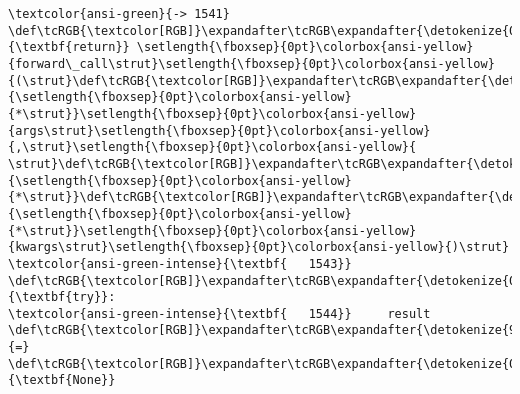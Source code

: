 \documentclass[11pt]{article}
\begin{document}
\begin{Verbatim}[commandchars=\\\{\}, frame=single, framerule=2mm, rulecolor=\color{outerrorbackground}]
\textcolor{ansi-green}{-> 1541}     \def\tcRGB{\textcolor[RGB]}\expandafter\tcRGB\expandafter{\detokenize{0,135,0}}{\textbf{return}} \setlength{\fboxsep}{0pt}\colorbox{ansi-yellow}{forward\_call\strut}\setlength{\fboxsep}{0pt}\colorbox{ansi-yellow}{(\strut}\def\tcRGB{\textcolor[RGB]}\expandafter\tcRGB\expandafter{\detokenize{98,98,98}}{\setlength{\fboxsep}{0pt}\colorbox{ansi-yellow}{*\strut}}\setlength{\fboxsep}{0pt}\colorbox{ansi-yellow}{args\strut}\setlength{\fboxsep}{0pt}\colorbox{ansi-yellow}{,\strut}\setlength{\fboxsep}{0pt}\colorbox{ansi-yellow}{ \strut}\def\tcRGB{\textcolor[RGB]}\expandafter\tcRGB\expandafter{\detokenize{98,98,98}}{\setlength{\fboxsep}{0pt}\colorbox{ansi-yellow}{*\strut}}\def\tcRGB{\textcolor[RGB]}\expandafter\tcRGB\expandafter{\detokenize{98,98,98}}{\setlength{\fboxsep}{0pt}\colorbox{ansi-yellow}{*\strut}}\setlength{\fboxsep}{0pt}\colorbox{ansi-yellow}{kwargs\strut}\setlength{\fboxsep}{0pt}\colorbox{ansi-yellow}{)\strut}
\textcolor{ansi-green-intense}{\textbf{   1543}} \def\tcRGB{\textcolor[RGB]}\expandafter\tcRGB\expandafter{\detokenize{0,135,0}}{\textbf{try}}:
\textcolor{ansi-green-intense}{\textbf{   1544}}     result \def\tcRGB{\textcolor[RGB]}\expandafter\tcRGB\expandafter{\detokenize{98,98,98}}{=} \def\tcRGB{\textcolor[RGB]}\expandafter\tcRGB\expandafter{\detokenize{0,135,0}}{\textbf{None}}


\end{Verbatim}
\end{document}

